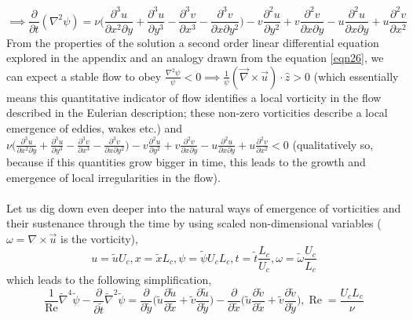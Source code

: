 \documentclass{article}
\begin{document}
\begin{equation} \label{eqn26}
\implies \frac{\partial}{\partial t}(\nabla^2 \psi) = \nu \bigg(\frac{\partial^3 u}{\partial x^2 \partial y}+\frac{\partial^3 u}{\partial y^3}-\frac{\partial^3 v}{\partial x^3}-\frac{\partial^3 v}{\partial x \partial y^2}\bigg) - v \frac{\partial^2 u}{\partial y^2} + v \frac{\partial^2 v}{\partial x \partial y} - u \frac{\partial^2 u}{\partial x \partial y} + u \frac{\partial^2 v}{\partial x^2}
\end{equation}
From the properties of the solution a second order linear differential equation explored in the appendix and an analogy drawn from the equation \ref{eqn26}, we can expect a stable flow to obey $\frac{\nabla^2 \psi}{\psi} < 0 \implies \frac{1}{\psi}(\vec{\nabla} \times \vec{u})\cdot\hat{z} > 0$ (which essentially means this quantitative indicator of flow identifies a local vorticity in the flow described in the Eulerian description; these non-zero vorticities describe a local emergence of eddies, wakes etc.) and $\nu \bigg(\frac{\partial^3 u}{\partial x^2 \partial y}+\frac{\partial^3 u}{\partial y^3}-\frac{\partial^3 v}{\partial x^3}-\frac{\partial^3 v}{\partial x \partial y^2}\bigg) - v \frac{\partial^2 u}{\partial y^2} + v \frac{\partial^2 v}{\partial x \partial y} - u \frac{\partial^2 u}{\partial x \partial y} + u \frac{\partial^2 v}{\partial x^2} < 0$ (qualitatively so, because if this quantities grow bigger in time, this leads to the growth and emergence of local irregularities in the flow). \\ \\
Let us dig down even deeper into the natural ways of emergence of vorticities and their sustenance through the time by using scaled non-dimensional variables ($\omega = \nabla \times \vec{u}$ is the vorticity),
\begin{equation*}
u = \tilde{u}U_c, x = \tilde{x} L_c, \psi = \tilde{\psi} U_c L_c, t = \tilde{t} \frac{L_c}{U_c}, \omega = \tilde{\omega} \frac{U_c}{L_c}
\end{equation*}
which leads to the following simplification,
\begin{equation*}
\frac{1}{\operatorname{Re}}\tilde{\nabla}^4 \tilde{\psi} - \frac{\partial}{\partial \tilde{t}} \tilde{\nabla}^2 \tilde{\psi} = \frac{\partial}{\partial \tilde{y}}\bigg(\tilde{u}\frac{\partial \tilde{u}}{\partial \tilde{x}}+\tilde{v}\frac{\partial \tilde{u}}{\partial \tilde{y}}\bigg)-\frac{\partial}{\partial \tilde{x}}\bigg(\tilde{u}\frac{\partial \tilde{v}}{\partial \tilde{x}}+\tilde{v}\frac{\partial \tilde{v}}{\partial \tilde{y}}\bigg), \operatorname{Re} = \frac{U_c L_c}{\nu}
\end{equation*}
\end{document}
